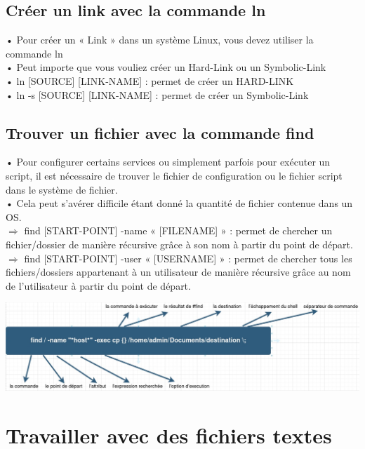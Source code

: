 \documentclass[a4paper, 11pt, french, oneside]{book}
\begin{document}
		\section{Créer un link avec la commande ln}
			• Pour créer un « Link » dans un système Linux, vous devez utiliser la commande ln\\
		    • Peut importe que vous vouliez créer un Hard-Link ou un Symbolic-Link\\
		    • ln [SOURCE] [LINK-NAME] : permet de créer un HARD-LINK\\
		    • ln -s [SOURCE] [LINK-NAME] : permet de créer un Symbolic-Link\\
		\section{Trouver un fichier avec la commande find}
		    • Pour configurer certains services ou simplement parfois pour exécuter un script, il est nécessaire de trouver le fichier de configuration ou le fichier script dans le système de fichier.\\
		    • Cela peut s’avérer difficile étant donné la quantité de fichier contenue dans un OS.\\
			$\Rightarrow$ find [START-POINT] -name « [FILENAME] » : permet de chercher un fichier/dossier de manière récursive grâce à son nom à partir du point de départ.\\
			$\Rightarrow$ find [START-POINT] -user « [USERNAME] » : permet de chercher tous les fichiers/dossiers appartenant à un utilisateur de manière	récursive grâce au nom de l’utilisateur à partir du point de départ.
		 	\begin{flushleft}
				\includegraphics[scale=0.5]{Find.jpg}
			\end{flushleft}
	\chapter{Travailler avec des fichiers textes}
\end{document}
